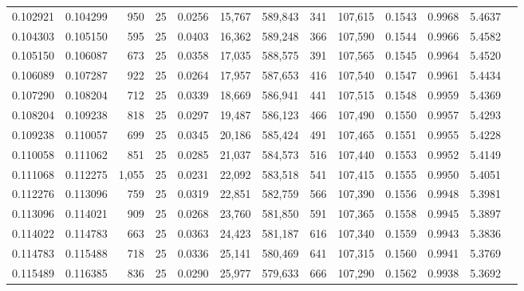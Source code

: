 \begin{tabular}{rrrrrrrrrrrrr}
0.102921 & 0.104299 &   950 &  25 &                                     0.0256 &  15,767 & 589,843 &     341 & 107,615 & 0.1543 & 0.9968 & 5.4637 \\
0.104303 & 0.105150 &   595 &  25 &                                     0.0403 &  16,362 & 589,248 &     366 & 107,590 & 0.1544 & 0.9966 & 5.4582 \\
0.105150 & 0.106087 &   673 &  25 &                                     0.0358 &  17,035 & 588,575 &     391 & 107,565 & 0.1545 & 0.9964 & 5.4520 \\
0.106089 & 0.107287 &   922 &  25 &                                     0.0264 &  17,957 & 587,653 &     416 & 107,540 & 0.1547 & 0.9961 & 5.4434 \\
0.107290 & 0.108204 &   712 &  25 &                                     0.0339 &  18,669 & 586,941 &     441 & 107,515 & 0.1548 & 0.9959 & 5.4369 \\
0.108204 & 0.109238 &   818 &  25 &                                     0.0297 &  19,487 & 586,123 &     466 & 107,490 & 0.1550 & 0.9957 & 5.4293 \\
0.109238 & 0.110057 &   699 &  25 &                                     0.0345 &  20,186 & 585,424 &     491 & 107,465 & 0.1551 & 0.9955 & 5.4228 \\
0.110058 & 0.111062 &   851 &  25 &                                     0.0285 &  21,037 & 584,573 &     516 & 107,440 & 0.1553 & 0.9952 & 5.4149 \\
0.111068 & 0.112275 & 1,055 &  25 &                                     0.0231 &  22,092 & 583,518 &     541 & 107,415 & 0.1555 & 0.9950 & 5.4051 \\
0.112276 & 0.113096 &   759 &  25 &                                     0.0319 &  22,851 & 582,759 &     566 & 107,390 & 0.1556 & 0.9948 & 5.3981 \\
0.113096 & 0.114021 &   909 &  25 &                                     0.0268 &  23,760 & 581,850 &     591 & 107,365 & 0.1558 & 0.9945 & 5.3897 \\
0.114022 & 0.114783 &   663 &  25 &                                     0.0363 &  24,423 & 581,187 &     616 & 107,340 & 0.1559 & 0.9943 & 5.3836 \\
0.114783 & 0.115488 &   718 &  25 &                                     0.0336 &  25,141 & 580,469 &     641 & 107,315 & 0.1560 & 0.9941 & 5.3769 \\
0.115489 & 0.116385 &   836 &  25 &                                     0.0290 &  25,977 & 579,633 &     666 & 107,290 & 0.1562 & 0.9938 & 5.3692 \\

\end{tabular}
